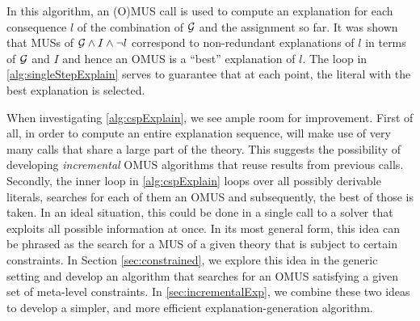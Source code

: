 In this algorithm, an (O)MUS call is used to compute an explanation for each consequence $l$ of the combination of $\mathcal{G} $ and the assignment so far. 
It was shown that MUSs of $\mathcal{G} \land I\land\lnot l$ correspond to non-redundant explanations of $l$ in terms of $\mathcal{G} $ and $I$ and hence an OMUS is a ``best'' explanation of $l$. 
The loop in \cref{alg:singleStepExplain} serves to guarantee that at each point, the literal with the best explanation is selected. 





When investigating \cref{alg:cspExplain}, we see ample room for improvement. 
First of all, in order to compute an entire explanation sequence, \label{alg:cspExplain} will make use of very many \omus calls that share a large part of the theory. 
This suggests the possibility of developing \emph{incremental} OMUS algorithms that reuse results from previous calls. 
Secondly, the inner loop in \cref{alg:cspExplain} loops over all possibly derivable  literals, searches for each of them an OMUS and subsequently, the best of those is taken. 
In an ideal situation, this could be done in a single call to a solver that exploits all possible information at once. 
In its most general form, this idea can be phrased as the search for a MUS of a given theory that is subject to certain constraints. 
In Section \ref{sec:constrained}, we explore this idea in the generic setting and develop an algorithm that searches for an OMUS satisfying a given set of meta-level constraints. 
In \cref{sec:incrementalExp}, we combine these two ideas to develop a simpler, and more efficient explanation-generation algorithm. 

